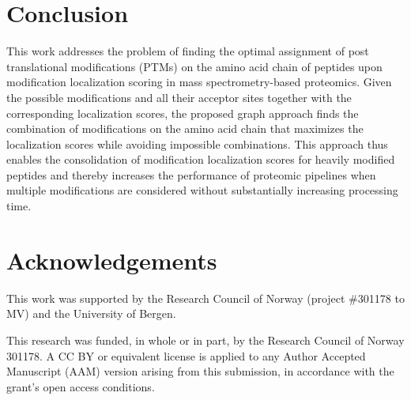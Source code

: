 \documentclass[]{article}
\begin{document}
\section{Conclusion}

	This work addresses the problem of finding the optimal assignment of post translational modifications (PTMs) on the amino acid chain of peptides upon modification localization scoring in mass spectrometry-based proteomics. Given the possible modifications and all their acceptor sites together with the corresponding localization scores, the proposed graph approach finds the combination of modifications on the amino acid chain that maximizes the localization scores while avoiding impossible combinations. This approach thus enables the consolidation of modification localization scores for heavily modified peptides and thereby increases the performance of proteomic pipelines when multiple modifications are considered without substantially increasing processing time.


\section{Acknowledgements}

This work was supported by the Research Council of Norway (project \#301178 to MV) and the University of Bergen.

This research was funded, in whole or in part, by the Research Council of Norway 301178. A CC BY or equivalent license is applied to any Author Accepted Manuscript (AAM) version arising from this submission, in accordance with the grant’s open access conditions.





\end{document}
